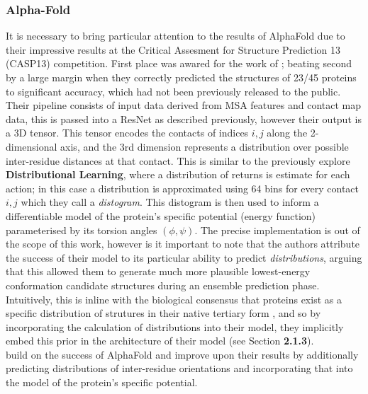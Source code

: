 \subsubsection{Alpha-Fold}
It is necessary to bring particular attention to the results of AlphaFold \cite{Senior2020} due
to their impressive results at the Critical Assesment for Structure Prediction 13 (CASP13) competition.
First place was awared for the work of \cite{Senior2020}; beating second by a large margin when they correctly
predicted the structures of 23/45 proteins to significant accuracy, which had not been previously released to the public.
Their pipeline consists of input data derived from MSA features and contact map data, this is passed into
a ResNet as described previously, however their output is a 3D tensor. This tensor encodes the contacts
of indices $i,j$ along the 2-dimensional axis, and the 3rd dimension represents a distribution over possible
inter-residue distances at that contact. This is similar to the previously explore \textbf{Distributional Learning}, where a
distribution of returns is estimate for each action; in this case a distribution is approximated using
64 bins for every contact $i,j$ which they call a \emph{distogram}. This distogram is then used to inform
a differentiable model of the protein's specific potential (energy function) parameterised by its torsion
angles $(\phi, \psi)$. The precise implementation is out of the scope of this work, however is it important to note 
that the authors attribute the success of their model to its particular ability to predict \emph{distributions}, arguing
that this allowed them to generate much more plausible lowest-energy conformation candidate structures during an ensemble
prediction phase. Intuitively, this is inline with the biological consensus that proteins exist as a 
specific distribution of strutures in their native tertiary form \cite{Yang}, and so by incorporating the calculation
of distributions into their model, they implicitly embed this prior in the architecture of their model (see Section \textbf{2.1.3}).\\

\cite{Yang2020} build on the success of AlphaFold and improve upon their results by additionally predicting
distributions of inter-residue orientations and incorporating that into the model of the protein's specific potential.
